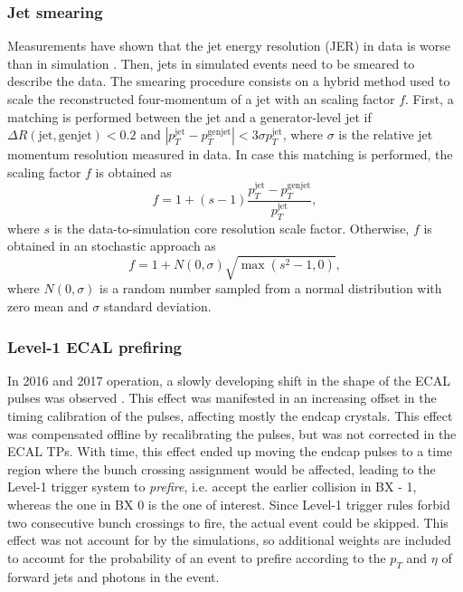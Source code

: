 \documentclass[../main.tex]{subfiles}
\begin{document}
\subsubsection*{Jet smearing}

Measurements have shown that the jet energy resolution (JER) in data is worse than in simulation \cite{hh:cor:smearing_8TeV}. Then, jets in simulated events need to be smeared to describe the data. The smearing procedure consists on a hybrid method used to scale the reconstructed four-momentum of a jet with an scaling factor $f$. First, a matching is performed between the jet and a generator-level jet if $\Delta R(\text{jet}, \text{genjet})<0.2$ and $|p_T^{\text{jet}} - p_T^{\text{genjet}}| < 3\sigma p_T^{\text{jet}}$, where $\sigma$ is the relative jet momentum resolution measured in data. In case this matching is performed, the scaling factor $f$ is obtained as
\begin{equation}
f = 1 + (s - 1)\frac{p_T^\text{jet} - p_T^\text{genjet}}{p_T^\text{jet}},
\end{equation}
where $s$ is the data-to-simulation core resolution scale factor. Otherwise, $f$ is obtained in an stochastic approach as
\begin{equation}
f = 1 + N(0, \sigma)\sqrt{\max(s^2-1, 0)},
\end{equation}
where $N(0, \sigma)$ is a random number sampled from a normal distribution with zero mean and $\sigma$ standard deviation.

\subsubsection*{Level-1 ECAL prefiring}

In 2016 and 2017 operation, a slowly developing shift in the shape of the ECAL pulses was observed \cite{intro:l1_13tev}. This effect was manifested in an increasing offset in the timing calibration of the pulses, affecting mostly the endcap crystals. This effect was compensated offline by recalibrating the pulses, but was not corrected in the ECAL TPs. With time, this effect ended up moving the endcap pulses to a time region where the bunch crossing assignment would be affected, leading to the Level-1 trigger system to \textit{prefire}, i.e. accept the earlier collision in BX - 1, whereas the one in BX 0 is the one of interest. Since Level-1 trigger rules forbid two consecutive bunch crossings to fire, the actual event could be skipped. This effect was not account for by the simulations, so additional weights are included to account for the probability of an event to prefire according to the $p_T$ and $\eta$ of forward jets and photons in the event.
\end{document}
